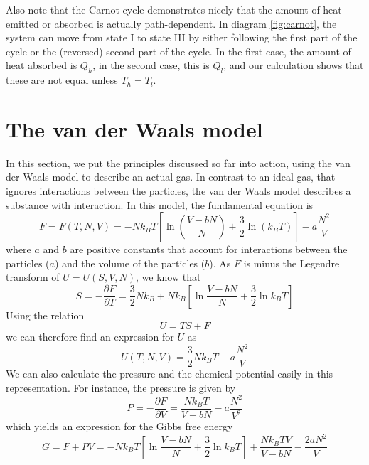 \documentclass[a4paper, draft]{article}
\theoremstyle{own}
\theoremstyle{remark}
\begin{document}
Also note that the Carnot cycle demonstrates nicely that the amount of heat emitted or absorbed is actually path-dependent. In diagram \ref{fig:carnot}, the system can move from state I to state III by either following the first part of the cycle or the (reversed) second part of the cycle. In the first case, the amount of heat absorbed is $Q_h$, in the second case, this is $Q_l$, and our calculation shows that these are not equal unless $T_h = T_l$.

\section{The van der Waals model}

In this section, we put the principles discussed so far into action, using the van der Waals model to describe an actual gas. In contrast to an ideal gas, that ignores interactions between the particles, the van der Waals model describes a substance with interaction. In this model, the fundamental equation is
$$
F = F(T,N,V) = - N k_B T [   \ln(\frac{V-bN}{N}) + \frac{3}{2} \ln (k_B T)] - a \frac{N^2}{V}
$$
where $a$ and $b$ are positive constants that account for interactions between the particles ($a$) and the volume of the particles ($b$). As $F$ is minus the Legendre transform of $U=U(S,V,N)$, we know that
$$
S = - \frac{\partial F}{\partial T} = \frac{3}{2} N k_B + 
N k_B [\ln \frac{V-bN}{N} + \frac{3}{2} \ln k_B T]
$$
Using the relation
$$
U = TS + F
$$
we can therefore find an expression for $U$ as
$$
U(T,N,V) = \frac{3}{2} N k_B T - a \frac{N^2}{V}
$$
We can also calculate the pressure and the chemical potential easily in this representation. For instance, the pressure is given by 
$$
P = - \frac{\partial F}{\partial V} =  \frac{N k_B T}{V-bN}  - a \frac{N^2}{V^2}
$$
which yields an expression for the Gibbs free energy
$$
G = F + PV = - N k_B T [ \ln\frac{V-bN}{N} + \frac{3}{2} \ln k_B T] + \frac{N k_B TV}{V-bN} 
-\frac{2aN^2}{V	}
$$
\end{document}
